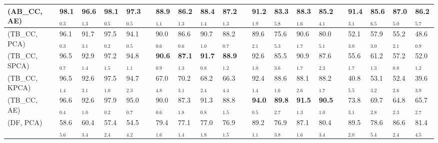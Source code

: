 \begin{table*}[!t]
{\begin{tabular}{llllllllllllllllllllll}
\multicolumn{2}{l}{(AB\_CC, AE)}       &  & \textbf{98.1$_{0.3}$} & \textbf{96.6$_{1.3}$} & \textbf{98.1$_{0.5}$} & \textbf{97.3$_{0.5}$} &  & 88.9$_{1.1}$          & 86.2$_{1.3}$          & 88.4$_{1.4}$          & 87.2$_{1.3}$          &  & 91.2$_{1.9}$          & 83.3$_{5.8}$          & 88.3$_{1.6}$          & 85.2$_{4.1}$          &  & 91.4$_{3.1}$          & 85.6$_{6.5}$          & 87.0$_{5.0}$          & 86.2$_{5.7}$          \\ \midrule
\multicolumn{2}{l}{(TB\_CC, PCA)}      &  & 96.1$_{0.3}$          & 91.7$_{3.1}$          & 97.5$_{0.2}$          & 94.1$_{0.5}$          &  & 90.0$_{0.6}$          & 86.6$_{0.6}$          & 90.7$_{1.0}$          & 88.2$_{0.7}$          &  & 89.6$_{2.1}$          & 75.6$_{5.3}$          & 90.6$_{1.7}$          & 80.0$_{5.1}$          &  & 52.1$_{3.0}$          & 57.9$_{3.0}$          & 55.2$_{2.1}$          & 48.6$_{0.9}$          \\
\multicolumn{2}{l}{(TB\_CC, SPCA)}     &  & 96.5$_{0.7}$          & 92.9$_{1.4}$          & 97.2$_{1.5}$          & 94.8$_{1.1}$          &  & \textbf{90.6$_{0.9}$} & \textbf{87.1$_{1.3}$} & \textbf{91.7$_{0.8}$} & \textbf{88.9$_{1.2}$} &  & 92.6$_{1.0}$          & 85.5$_{3.6}$          & 90.9$_{1.7}$          & 87.6$_{2.3}$          &  & 55.6$_{1.7}$          & 61.2$_{1.3}$          & 57.2$_{0.8}$          & 52.0$_{1.2}$          \\
\multicolumn{2}{l}{(TB\_CC, KPCA)}     &  & 96.5$_{1.4}$          & 92.6$_{3.1}$          & 97.5$_{1.0}$          & 94.7$_{2.3}$          &  & 67.0$_{4.8}$          & 70.2$_{3.1}$          & 68.2$_{2.4}$          & 66.3$_{4.4}$          &  & 92.4$_{1.4}$          & 88.6$_{1.6}$          & 88.1$_{2.6}$          & 88.2$_{1.7}$          &  & 40.8$_{5.5}$          & 53.1$_{3.2}$          & 52.4$_{2.6}$          & 39.6$_{3.9}$          \\
\multicolumn{2}{l}{(TB\_CC, AE)}       &  & 96.6$_{0.4}$          & 92.6$_{1.0}$          & 97.9$_{0.2}$          & 95.0$_{0.7}$          &  & 90.0$_{0.6}$          & 87.3$_{1.8}$          & 91.3$_{0.8}$          & 88.8$_{1.5}$          &  & \textbf{94.0$_{0.5}$} & \textbf{89.8$_{2.7}$} & \textbf{91.5$_{1.3}$} & \textbf{90.5$_{1.0}$} &  & 73.8$_{3.1}$          & 69.7$_{2.8}$          & 64.8$_{2.3}$          & 65.7$_{2.7}$          \\ \midrule
\multicolumn{2}{l}{(DF, PCA)}          &  & 58.6$_{5.6}$          & 60.4$_{3.4}$          & 57.4$_{2.4}$          & 54.5$_{4.2}$          &  & 79.4$_{1.6}$          & 77.1$_{1.4}$          & 77.0$_{1.8}$          & 76.9$_{1.5}$          &  & 89.2$_{1.1}$          & 76.9$_{3.8}$          & 87.1$_{1.6}$          & 80.4$_{3.4}$          &  & 89.5$_{2.0}$          & 78.6$_{5.4}$          & 86.6$_{2.4}$          & 81.4$_{4.5}$          \\

\end{tabular}}
\end{table*}
